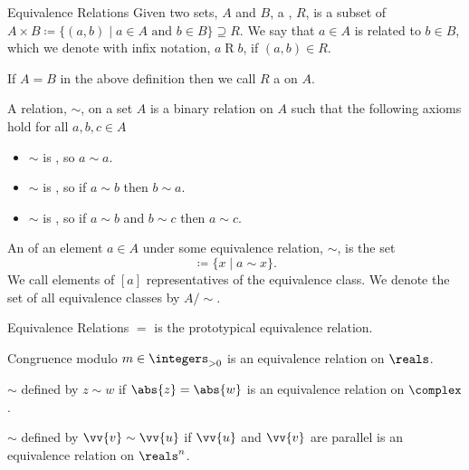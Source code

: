 \begin{dfn}{Equivalence Relations}{}
    Given two sets, \(A\) and \(B\), a , \(R\), is a subset of \(A \times B \coloneqq \{(a, b) \mid a \in A \text{ and } b \in B\} \supseteq R\).
    We say that \(a \in A\) is related to \(b \in B\), which we denote with infix notation, \(a\mathbin{R}b\), if \((a, b) \in R\).
    
    If \(A = B\) in the above definition then we call \(R\) a  on \(A\).
    
    A relation, \(\sim\), on a set \(A\) is a binary relation on \(A\) such that the following axioms hold for all \(a, b, c \in A\)
    \begin{itemize}
        \item \(\sim\) is , so \(a \sim a\).
        \item \(\sim\) is , so if \(a \sim b\) then \(b \sim a\).
        \item \(\sim\) is , so if \(a \sim b\) and \(b \sim c\) then \(a \sim c\).
    \end{itemize}
    
    An  of an element \(a \in A\) under some equivalence relation, \(\sim\), is the set
    \begin{equation}
        [a] \coloneqq \{x \mid a \sim x\}.
    \end{equation}
    We call elements of \([a]\) representatives of the equivalence class.
    We denote the set of all equivalence classes by \(A/\sim\).
\end{dfn}

\begin{exm}{Equivalence Relations}{}
    \(=\) is the prototypical equivalence relation.
    
    Congruence modulo \(m \in \positiveintegers\) is an equivalence relation on \(\reals\).
    
    \(\sim\) defined by \(z\sim w\) if \(\abs{z} = \abs{w}\) is an equivalence relation on \(\complex\).
    
    \(\sim\) defined by \(\vv{v} \sim \vv{u}\) if \(\vv{u}\) and \(\vv{v}\) are parallel is an equivalence relation on \(\reals^n\).
\end{exm}

